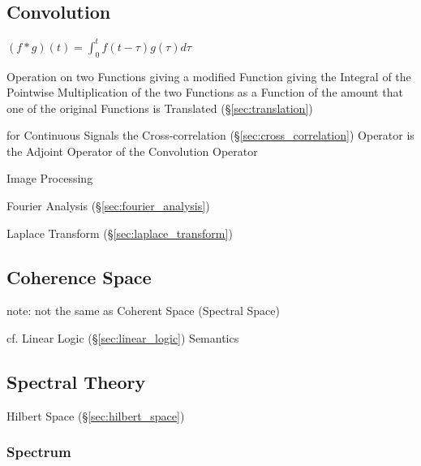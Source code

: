 \subsection{Convolution}\label{sec:convolution}

$(f * g)(t) = \int_0^t f(t-\tau) g(\tau) d\tau$

Operation on two Functions giving a modified Function giving the Integral of
the Pointwise Multiplication of the two Functions as a Function of the amount
that one of the original Functions is Translated (\S\ref{sec:translation})

for Continuous Signals the Cross-correlation (\S\ref{sec:cross_correlation})
Operator is the Adjoint Operator of the Convolution Operator

Image Processing

\fist Fourier Analysis (\S\ref{sec:fourier_analysis})

Laplace Transform (\S\ref{sec:laplace_transform})



\subsection{Coherence Space}\label{sec:coherence_space}

note: not the same as Coherent Space (Spectral Space)

cf. Linear Logic (\S\ref{sec:linear_logic}) Semantics



\subsection{Spectral Theory}\label{sec:spectral_theory}

Hilbert Space (\S\ref{sec:hilbert_space})



\subsubsection{Spectrum}\label{sec:spectrum}

